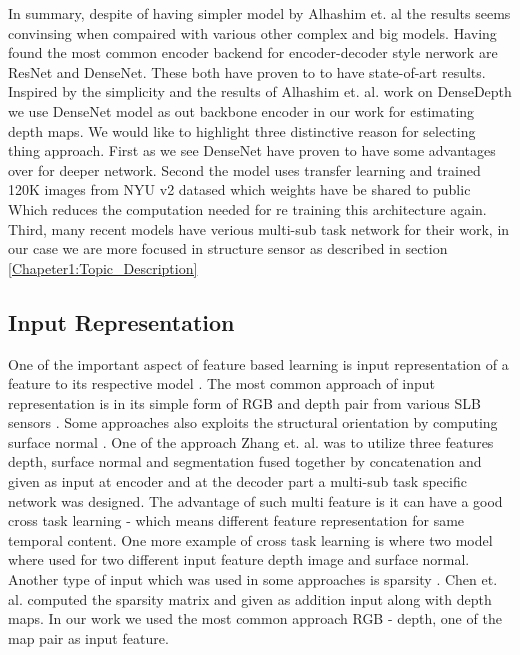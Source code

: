 In summary, despite of having simpler model by Alhashim et. al \cite{Alhashim2018}  the results seems convinsing when compaired with various other complex and big models. Having found the most common encoder backend for encoder-decoder style nerwork are  ResNet and DenseNet. These both have proven to to have state-of-art results. Inspired by the simplicity and the results of  Alhashim et. al. work on DenseDepth we use DenseNet model as out backbone encoder in our work for estimating depth maps. We would like to highlight three distinctive reason for selecting thing approach. First as we see DenseNet have proven to have some advantages over for deeper network. Second the model uses transfer learning and trained 120K images from NYU v2 datased which weights have be shared to public Which reduces the computation needed for re training this architecture again. Third, many recent models have verious multi-sub task network for their work, in our case we are more focused in structure sensor as described in section \ref{Chapeter1:Topic_Description} 


\subsection{Input Representation}
One of the important aspect of feature based learning is input representation of a feature to its respective model \cite{friedman2001elements}. The most common approach of input representation is in its simple form of RGB and depth pair from various SLB sensors \cite{eigen2014depth, xu2017multi}. Some approaches also exploits the structural orientation by computing surface normal \cite{li2015depth, qi2018geonet}. One of the approach Zhang et. al. \cite{Zhang_2019_CVPR} was to utilize three features  depth, surface normal and segmentation fused together by concatenation and given as input at encoder and at the decoder part a multi-sub task specific network was designed. The advantage of such multi feature is it can have a good cross task learning - which means different feature representation for same temporal content. One more example of  cross task learning is \cite{qi2018geonet} where two model where used for two different input feature depth image and surface normal. Another type of input which was used in some approaches is sparsity  \cite{chen2018estimating, mal2018sparse}. Chen et. al. \cite{chen2018estimating} computed the sparsity matrix and given as addition input along with depth maps. In our work we used the most common approach RGB - depth, one of the map pair as input feature.  


